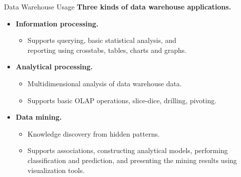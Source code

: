 \begin{frame}{Data Warehouse Usage}
	\textbf{Three kinds of data warehouse applications.}
	\begin{itemize}
		\item \textbf{\color{airforceblue}Information processing.}
		      \begin{itemize}
			      \item Supports querying, basic statistical analysis, and \\ reporting using crosstabs, tables, charts and graphs.
		      \end{itemize}
		\item \textbf{\color{airforceblue}Analytical processing.}
		      \begin{itemize}
			      \item Multidimensional analysis of data warehouse data.
			      \item Supports basic OLAP operations, slice-dice, drilling, pivoting.
		      \end{itemize}
		\item \textbf{\color{airforceblue}Data mining.}
		      \begin{itemize}
			      \item Knowledge discovery from hidden patterns.
			      \item Supports associations, constructing analytical models, performing classification and prediction, and presenting the mining results using visualization tools.
		      \end{itemize}
	\end{itemize}
\end{frame}


